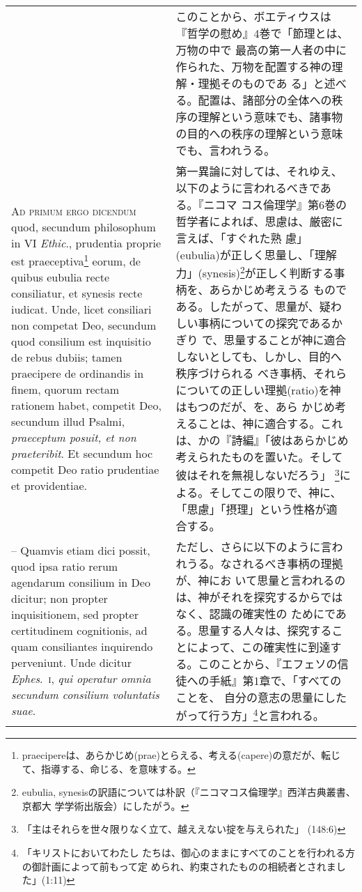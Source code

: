 \documentclass[10pt]{jsarticle} %
\begin{document}
\begin{longtable}{p{21em}p{21em}}
&

このことから、ボエティウスは『哲学の慰め』4巻で「節理とは、万物の中で
最高の第一人者の中に作られた、万物を配置する神の理解・理拠そのものであ
る」と述べる。配置は、諸部分の全体への秩序の理解という意味でも、諸事物
の目的への秩序の理解という意味でも、言われうる。

\\


{\scshape Ad primum ergo dicendum} quod, secundum
philosophum in VI {\itshape Ethic}., prudentia proprie est praeceptiva\footnote{praecipereは、あらかじめ(prae)とらえる、考える(capere)の意だが、転じて、指導する、命じる、を意味する。} eorum, de
quibus eubulia recte consiliatur, et synesis recte iudicat. Unde, licet
consiliari non competat Deo, secundum quod consilium est inquisitio de
rebus dubiis; tamen praecipere de ordinandis in finem, quorum rectam
rationem habet, competit Deo, secundum illud Psalmi, {\itshape praeceptum posuit,
et non praeteribit}. Et secundum hoc competit Deo ratio prudentiae et
providentiae. 


&


第一異論に対しては、それゆえ、以下のように言われるべきである。『ニコマ
コス倫理学』第6巻の哲学者によれば、思慮は、厳密に言えば、「すぐれた熟
慮」(eubulia)が正しく思量し、「理解力」(synesis)\footnote{eubulia,
synesisの訳語については朴訳（『ニコマコス倫理学』西洋古典叢書、京都大
学学術出版会）にしたがう。}が正しく判断する事柄を、あらかじめ考えうる
ものである。したがって、思量が、疑わしい事柄についての探究であるかぎり
で、思量することが神に適合しないとしても、しかし、目的へ秩序づけられる
べき事柄、それらについての正しい理拠(ratio)を神はもつのだが、を、あら
かじめ考えることは、神に適合する。これは、かの『詩編』「彼はあらかじめ
考えられたものを置いた。そして彼はそれを無視しないだろう」
\footnote{「主はそれらを世々限りなく立て、越ええない掟を与えられた」
(148:6)}による。そしてこの限りで、神に、「思慮」「摂理」という性格が適
合する。


\\


-- Quamvis etiam dici possit, quod ipsa ratio rerum agendarum
consilium in Deo dicitur; non propter inquisitionem, sed propter
certitudinem cognitionis, ad quam consiliantes inquirendo
perveniunt. Unde dicitur {\itshape Ephes}.~{\scshape i}, {\itshape qui operatur omnia secundum consilium
voluntatis suae}.

&

ただし、さらに以下のように言われうる。なされるべき事柄の理拠が、神にお
いて思量と言われるのは、神がそれを探究するからではなく、認識の確実性の
ためにである。思量する人々は、探究することによって、この確実性に到達す
る。このことから、『エフェソの信徒への手紙』第1章で、「すべてのことを、
自分の意志の思量にしたがって行う方」\footnote{「キリストにおいてわたし
たちは、御心のままにすべてのことを行われる方の御計画によって前もって定
められ、約束されたものの相続者とされました」(1:11)}と言われる。




\end{longtable}
\end{document}
